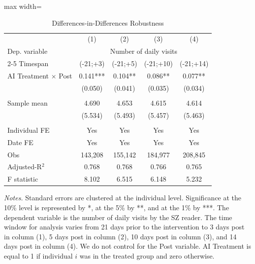  \begin{table}[H]
 \centering 
 \caption{Differences-in-Differences Robustness} 
 \label{tab:TableA10_did_robustness} 
 \begin{adjustbox}{max width=\textwidth} 
\begin{tabular}{lcccc} 
 \toprule
& (1) & (2) & (3) & (4)  \\
 Dep. variable & \multicolumn{4}{c}{Number of daily visits} \\ 
 \cmidrule(lr){2-5} 
Timespan & (-21;+3) & (-21;+5) & (-21;+10) & (-21;+14) \\
 \midrule 
AI Treatment $\times$ Post&    0.141***&    0.104** &    0.086** &    0.077** \\
                &  (0.050)   &  (0.041)   &  (0.035)   &  (0.034)   \\
& & & &  \\
Sample mean&      4.690 &      4.653 &      4.615 &      4.614  \\
& (5.534) & (5.493) & (5.457) & (5.463)  \\
& & & &  \\
Individual FE & Yes & Yes & Yes  & Yes\\
Date FE & Yes & Yes & Yes & Yes\\
 \midrule
Obs &    143,208 &    155,142 &    184,977 &    208,845  \\
Adjusted-R$^2$ &      0.768 &      0.768 &      0.766 &      0.765  \\
F statistic &      8.102 &      6.515 &      6.148 &      5.232  \\
 \bottomrule
 \end{tabular}
 \end{adjustbox}
 \par
 \begin{minipage}{0.82\linewidth}
 \baselineskip9pt {\scriptsize \vspace{0.1cm} { \it Notes.} Standard errors are clustered at the individual level. Significance at the 10\% level is represented by *, at the 5\% by **, and at the 1\% by ***. The dependent variable is the number of daily visits by the SZ reader. The time window for analysis varies from 21 days prior to the intervention to 3 days post in column (1), 5 days post in column (2), 10 days post in column (3), and 14 days post in column (4). We do not control for the Post variable. AI Treatment is equal to 1 if individual $i$ was in the treated group and zero otherwise.}
 \end{minipage}
 \end{table}
